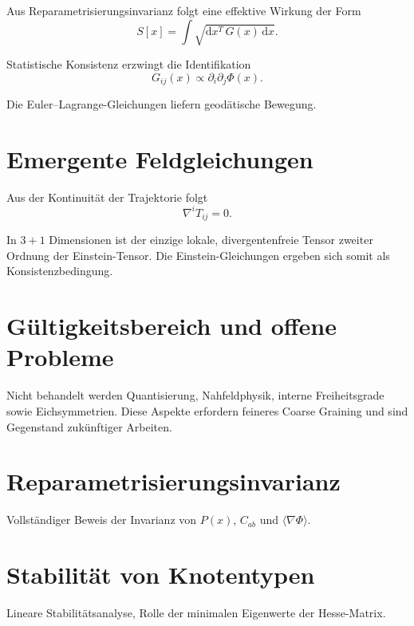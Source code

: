 \documentclass[11pt,a4paper]{article}
\renewcommand{\dd}{\mathrm{d}}
\begin{document}
Aus Reparametrisierungsinvarianz folgt eine effektive Wirkung der Form
\begin{equation}
 S[x] = \int \sqrt{\dd x^T \, G(x) \, \dd x}.
\end{equation}

Statistische Konsistenz erzwingt die Identifikation
\begin{equation}
 G_{ij}(x) \propto \partial_i \partial_j \Phi(x).
\end{equation}

Die Euler--Lagrange-Gleichungen liefern geodätische Bewegung.

\section{Emergente Feldgleichungen}

Aus der Kontinuität der Trajektorie folgt
\begin{equation}
 \nabla^i T_{ij} = 0.
\end{equation}

In $3+1$ Dimensionen ist der einzige lokale, divergentenfreie Tensor zweiter Ordnung der Einstein-Tensor. Die Einstein-Gleichungen ergeben sich somit als Konsistenzbedingung.

\section{G\"ultigkeitsbereich und offene Probleme}

Nicht behandelt werden Quantisierung, Nahfeldphysik, interne Freiheitsgrade sowie Eichsymmetrien. Diese Aspekte erfordern feineres Coarse Graining und sind Gegenstand zukünftiger Arbeiten.

\appendix

\section{Reparametrisierungsinvarianz}

Vollständiger Beweis der Invarianz von $P(x)$, $C_{ab}$ und $\langle \nabla \Phi \rangle$.

\section{Stabilit\"at von Knotentypen}

Lineare Stabilitätsanalyse, Rolle der minimalen Eigenwerte der Hesse-Matrix.
\end{document}
